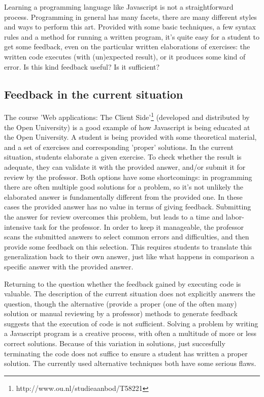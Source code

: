 \documentclass{article}
\begin{document}
Learning a programming language like Javascript is not a straightforward 
process. Programming in general has many facets, there are many different styles 
and ways to perform this art. Provided with some basic techniques, a few syntax 
rules and a method for running a written program, it's quite easy for a student 
to get some feedback, even on the particular written elaborations of exercises: 
the written code executes (with (un)expected result), or it produces some kind 
of error. Is this kind feedback useful? Is it sufficient? 

\subsection{Feedback in the current situation} 

The course 'Web applications: The Client 
Side'\footnote{http://www.ou.nl/studieaanbod/T58221} (developed and distributed 
by the Open University) is a good example of how Javascript is being educated at 
the Open University. A student is being provided with some theoretical material, 
and a set of exercises and corresponding 'proper' solutions. In the current 
situation, students elaborate a given exercise. To check whether the result is 
adequate, they can validate it with the provided answer, and/or submit it for 
review by the professor. Both options have some shortcomings: in programming 
there are often multiple good solutions for a problem, so it’s not unlikely 
the elaborated answer is fundamentally different from the provided one. In these 
cases the provided answer has no value in terms of giving feedback. Submitting 
the answer for review overcomes this problem, but leads to a time and 
labor-intensive task for the professor. In order to keep it manageable, the 
professor scans the submitted answers to select common errors and difficulties, 
and then provide some feedback on this selection. This requires students to 
translate this generalization back to their own answer, just like what happens 
in comparison a specific answer with the provided answer. 

Returning to the question whether the feedback gained by executing code is 
valuable. The description of the current situation does not explicitly answers 
the question, though the alternative (provide a proper (one of the often 
many) solution or manual reviewing by a professor) methods to generate
feedback suggests that the execution of code is not sufficient. 
Solving a problem by writing a Javascript program is a creative process, 
with often a multitude of more or less correct solutions. Because of 
this variation in solutions, just succesfully terminating the code does 
not suffice to ensure a student has written a proper solution. 
The currently used alternative techniques both have some serious flaws. 
\end{document}
